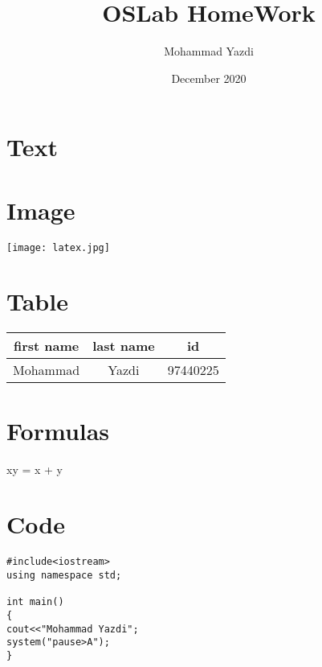 \documentclass{article}
\title{OSLab HomeWork}
\author{Mohammad Yazdi }
\date{December 2020}
\begin{document}
\maketitle

\section{Text}

\section{Image}
\begin{center}

    \texttt{[image: latex.jpg]}
\end{center}
    

\section{Table}

    \begin{tabular}{|c|c|c|}
    
    \hline
         first name & last name & id \\
    \hline
        Mohammad & Yazdi & 97440225 \\
    \hline     
        
    \end{tabular}
   


\section{Formulas}

\begin{left}

 \log xy = \log x + \log y
 
\end{left}


\section{Code}

\lstset{language = c++}
\begin{lstlisting}
#include<iostream>
using namespace std;

int main()
{
cout<<"Mohammad Yazdi";
system("pause>A");
}

\end{lstlisting}
\end{document}
